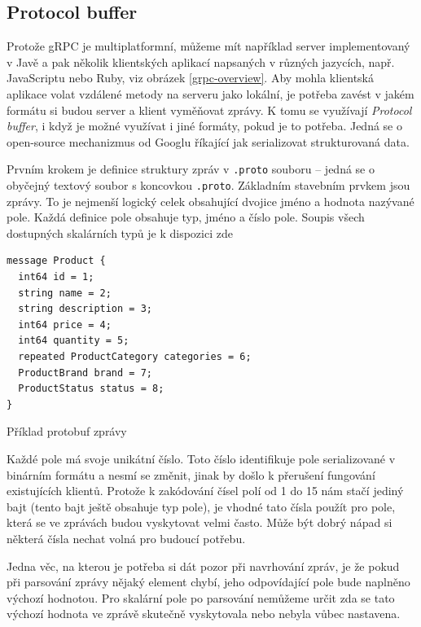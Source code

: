 \documentclass[thesis=M,czech]{FITthesis}[2019/12/23]
\begin{document}
\subsection{Protocol buffer}
Protože gRPC je multiplatformní, můžeme mít například server implementovaný v Javě a pak několik klientských aplikací napsaných v různých jazycích, např. JavaScriptu nebo Ruby, viz obrázek \ref{grpc-overview}. Aby mohla klientská aplikace volat vzdálené metody na serveru jako lokální, je potřeba zavést v jakém formátu si budou server a klient vyměňovat zprávy. K tomu se využívají \textit{Protocol buffer}, i když je možné využívat i jiné formáty, pokud je to potřeba. Jedná se o open-source mechanizmus od Googlu říkající jak serializovat strukturovaná data.

Prvním krokem je definice struktury zpráv v \texttt{.proto} souboru -- jedná se o obyčejný textový soubor s koncovkou \texttt{.proto}. Základním stavebním prvkem jsou zprávy. To je nejmenší logický celek obsahující dvojice jméno a hodnota nazývané pole. Každá definice pole obsahuje typ, jméno a číslo pole. Soupis všech dostupných skalárních typů je k dispozici zde \cite{proto_scalars}

\begin{listing}[H]
\begin{verbatim}
message Product {
  int64 id = 1;
  string name = 2;
  string description = 3;
  int64 price = 4;
  int64 quantity = 5;
  repeated ProductCategory categories = 6;
  ProductBrand brand = 7;
  ProductStatus status = 8;
}
\end{verbatim}
\caption{Příklad protobuf zprávy}
\label{lst:protobuf_example}
\end{listing}

Každé pole má svoje unikátní číslo. Toto číslo identifikuje pole serializované v binárním formátu a nesmí se změnit, jinak by došlo k přerušení fungování existujících klientů. Protože k zakódování čísel polí od 1 do 15 nám stačí jediný bajt (tento bajt ještě obsahuje typ pole), je vhodné tato čísla použít pro pole, která se ve zprávách budou vyskytovat velmi často. Může být dobrý nápad si některá čísla nechat volná pro budoucí potřebu.

Jedna věc, na kterou je potřeba si dát pozor při navrhování zpráv, je že pokud při parsování zprávy nějaký element chybí, jeho odpovídající pole bude naplněno výchozí hodnotou. Pro skalární pole po parsování nemůžeme určit zda se tato výchozí hodnota ve zprávě skutečně vyskytovala nebo nebyla vůbec nastavena. 
\end{document}
